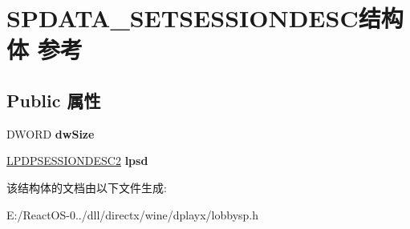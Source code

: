 \hypertarget{struct_s_p_d_a_t_a___s_e_t_s_e_s_s_i_o_n_d_e_s_c}{}\section{S\+P\+D\+A\+T\+A\+\_\+\+S\+E\+T\+S\+E\+S\+S\+I\+O\+N\+D\+E\+S\+C结构体 参考}
\label{struct_s_p_d_a_t_a___s_e_t_s_e_s_s_i_o_n_d_e_s_c}
\subsection*{Public 属性}
\begin{DoxyCompactItemize}
\item 
\mbox{\label{struct_s_p_d_a_t_a___s_e_t_s_e_s_s_i_o_n_d_e_s_c_a74317defc2b0b9f814ccdc7ac3af4eee}} 
D\+W\+O\+RD {\bfseries dw\+Size}
\item 
\mbox{\label{struct_s_p_d_a_t_a___s_e_t_s_e_s_s_i_o_n_d_e_s_c_a7375ae00e857e86457900c34c561c2f4}} 
\hyperlink{structtag_d_p_s_e_s_s_i_o_n_d_e_s_c2}{L\+P\+D\+P\+S\+E\+S\+S\+I\+O\+N\+D\+E\+S\+C2} {\bfseries lpsd}
\end{DoxyCompactItemize}


该结构体的文档由以下文件生成\+:\begin{DoxyCompactItemize}
\item 
E\+:/\+React\+O\+S-\/0../dll/directx/wine/dplayx/lobbysp.\+h\end{DoxyCompactItemize}
